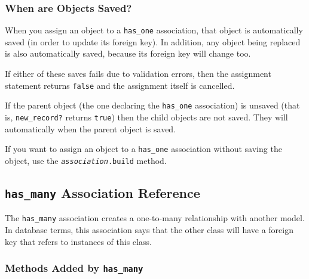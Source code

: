 \documentclass[10pt]{book}
\begin{document}
\subsubsection{ When are Objects Saved?}

When you assign an object to a \texttt{has\_one} association, that  object is automatically saved (in order to update its foreign key). In  addition, any object being replaced is also automatically saved, because  its foreign key will change too.

If either of these saves fails due to validation errors, then the assignment statement returns \texttt{false} and the assignment itself is cancelled.

If the parent object (the one declaring the \texttt{has\_one} association) is unsaved (that is, \texttt{new\_record?} returns \texttt{true}) then the child objects are not saved. They will automatically when the parent object is saved.

If you want to assign an object to a \texttt{has\_one} association without saving the object, use the \texttt{\emph{association}.build} method.

\subsection{ \texttt{has\_many} Association Reference}

The \texttt{has\_many} association creates a one-to-many relationship  with another model. In database terms, this association says that the  other class will have a foreign key that refers to instances of this  class.

\subsubsection{ Methods Added by \texttt{has\_many}}
\end{document}
